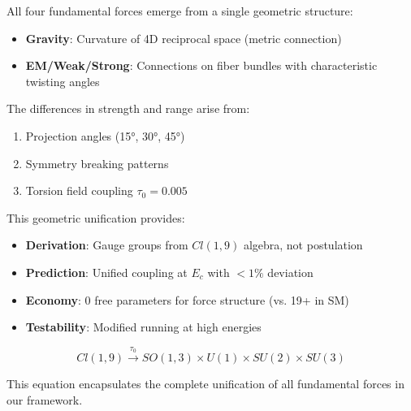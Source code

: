 \begin{insight}
All four fundamental forces emerge from a single geometric structure:
\begin{itemize}
    \item \textbf{Gravity}: Curvature of 4D reciprocal space (metric connection)
    \item \textbf{EM/Weak/Strong}: Connections on fiber bundles with characteristic twisting angles
\end{itemize}
The differences in strength and range arise from:
\begin{enumerate}
    \item Projection angles (15°, 30°, 45°)
    \item Symmetry breaking patterns
    \item Torsion field coupling $\tau_0 = 0.005$
\end{enumerate}
\end{insight}

This geometric unification provides:
\begin{itemize}
    \item \textbf{Derivation}: Gauge groups from $Cl(1,9)$ algebra, not postulation
    \item \textbf{Prediction}: Unified coupling at $E_c$ with $<1\%$ deviation
    \item \textbf{Economy}: 0 free parameters for force structure (vs. 19+ in SM)
    \item \textbf{Testability}: Modified running at high energies
\end{itemize}

\begin{equation}
    \boxed{Cl(1,9) \xrightarrow{\tau_0} SO(1,3) \times U(1) \times SU(2) \times SU(3)}
\end{equation}

This equation encapsulates the complete unification of all fundamental forces in our framework.